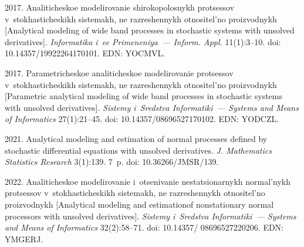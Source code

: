  


\vspace*{6pt}

    


  \begin{multicols}{2}

\renewcommand{\bibname}{\protect\rmfamily References}

{\small\frenchspacing
 {%
 \begin{thebibliography}{99}  

 2017. 
Analiticheskoe modelirovanie shirokopolosnykh protsessov v~stokhasticheskikh sistemakh, ne razreshennykh otnositel'no proizvodnykh  
[Analytical modeling of wide band processes in stochastic systems with unsolved derivatives]. 
\textit{Informatika i~ee Primeneniya~--- Inform. Appl.} 11(1):3--10.
doi: 10.14357/19922264170101. EDN: YOCMVL.


  2017.
Parametricheskoe analiticheskoe modelirovanie protsessov v~stokhasticheskikh sistemakh, ne razreshennykh otnositel'no proizvodnykh
 [Parametric analytical modeling of wide band processes in stochastic systems with unsolved derivatives]. \textit{Sistemy i~Sredstva
Informatiki~--- Systems and Means of Informatics} 27(1):21--45. doi: 10.14357/08696527170102. EDN: YODCZL.

 2021. 
Analytical modeling and estimation of normal processes defined by stochastic differential equations with unsolved derivatives. 
\textit{J. Mathematics Statistics Research} 3(1):139. 7~p. doi: 10.36266/JMSR/139.

 2022. 
Analiticheskoe modelirovanie i~otsenivanie nestatsionarnykh normal'nykh pro\-tses\-sov v~sto\-kha\-sti\-che\-skikh sis\-te\-makh, ne raz\-re\-shen\-nykh 
ot\-no\-si\-tel'\-no pro\-iz\-vod\-nykh 
[Analytical modeling and estimation\linebreak of nonstationary normal processors with unsolved derivatives].
 \textit{Sistemy i~Sredstva Informatiki~--- Systems and Means of Informatics} 32(2):58--71. doi: 10.14357/ 08696527220206. EDN: YMGERJ.


\end{thebibliography}}}
\end{multicols}
